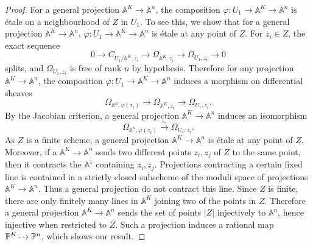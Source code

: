 \documentclass[JEP,XML,SOM,Unicode,published]{cedram}
\newcommand{\dradpl}{{\hspace*{-2.5mm}\begin{tikzcd}[ampersand replacement=\&,column sep = scriptsize]\mbox{}\ar[r,dashed]\&\mbox{}\end{tikzcd}\hspace*{-2mm}}}
\newcommand{\dratst}{{\hspace*{-2.5mm}\begin{tikzcd}[ampersand replacement=\&,column sep = small]\mbox{}\ar[r,dashed]\&\mbox{}\end{tikzcd}\hspace*{-2mm}}}
\let\drascst\dratst
\newcommand{\dra}{\mathchoice{\dradpl}{\dratst}{\drascst}{\drascst}}
\theoremstyle{plain}
\theoremstyle{definition}
\newcommand{\A}{\mathbb{A}}
\newcommand{\pr}{\mathbb{P}}
\begin{document}
\begin{proof}
For a general projection $\A^{\!K}\to \A^n$, the composition $\varphi: U_1\to \A^{\!K}\to \A^n$ is étale on a neighbourhood of $Z$ in $U_1$. To see this, we show that for a general projection $\A^{\!K}\to \A^n$, $\varphi: U_1\to \A^{\!K}\to \A^n$ is étale at any point of $Z$. For $z_i\in Z$, the exact sequence
\[
0 \to C_{U_1/\A^{\!K},z_i} \to \Omega_{\A^{\!K}, z_i} \to \Omega_{U_1,z_i}\to 0
\]
splits, and $ \Omega_{U_1,z_i}$ is free of rank $n$ by hypothesis. Therefore for any projection $\A^{\!K}\!\to\!\A^n$, the composition $\varphi: U_1\to \A^{\!K}\to \A^n$ induces a morphism on differential sheaves
\[
\Omega_{\A^n, \varphi(z_i)} \to \Omega_{\A^{\!K}, z_i}\to \Omega_{U_1, z_i}.
\]
By the Jacobian criterion, a general projection $\A^{\!K}\to \A^n$ induces an isomorphism
\[
\Omega_{\A^n, \varphi(z_i)} \stackrel{\sim}\to \Omega_{U_1, z_i}.
\]
As $Z$ is a finite scheme, a general projection $\A^{\!K}\to \A^n$ is étale at any point of $Z$. Moreover, if a $\A^{\!K}\to \A^n$ sends two different points $z_i, z_j$ of $Z$ to the same point, then it contracts the $\A^1$ containing $z_i,z_j$. Projections contracting a certain fixed line is contained in a strictly closed subscheme of the moduli space of projections $\A^{\!K}\to \A^n$. Thus a general projection do not contract this line. Since $Z$ is finite, there are only finitely many lines in $\A^{\!K}$ joining two of the points in $Z$. Therefore a general projection $\A^{\!K}\to \A^n$ sends the set of points $|Z|$ injectively to $\A^n$, hence injective when restricted to $Z$. Such a projection induces a rational map $\pr^K \dra \pr^n$, which shows our result.
\end{proof}
\end{document}
